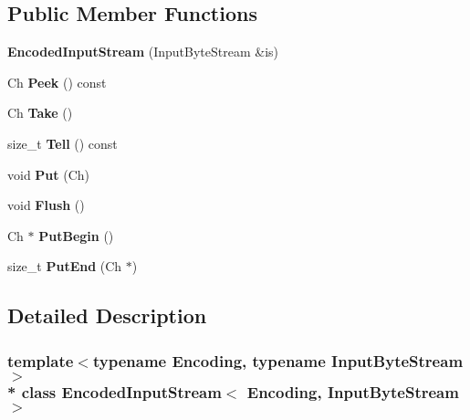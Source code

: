 \subsection*{Public Member Functions}
\begin{DoxyCompactItemize}
\item 
{\bfseries Encoded\+Input\+Stream} (Input\+Byte\+Stream \&is)\hypertarget{a00092_a17f8e629500f6ae71cb72d1d63bf41fd}{}\label{a00092_a17f8e629500f6ae71cb72d1d63bf41fd}

\item 
Ch {\bfseries Peek} () const \hypertarget{a00092_abda3b0c141254343f4c481f67d52b423}{}\label{a00092_abda3b0c141254343f4c481f67d52b423}

\item 
Ch {\bfseries Take} ()\hypertarget{a00092_ab42cd57581bf62e42af471583e5b8377}{}\label{a00092_ab42cd57581bf62e42af471583e5b8377}

\item 
size\+\_\+t {\bfseries Tell} () const \hypertarget{a00092_a34cdb99fd81cd211f71903348e9c986f}{}\label{a00092_a34cdb99fd81cd211f71903348e9c986f}

\item 
void {\bfseries Put} (Ch)\hypertarget{a00092_afea36b666a44bd4adeabfcab7b68a322}{}\label{a00092_afea36b666a44bd4adeabfcab7b68a322}

\item 
void {\bfseries Flush} ()\hypertarget{a00092_aa4415bf4b97dd01e8c3de0ad7a161724}{}\label{a00092_aa4415bf4b97dd01e8c3de0ad7a161724}

\item 
Ch $\ast$ {\bfseries Put\+Begin} ()\hypertarget{a00092_ad97f7a549a8622c61b7fb2c63fedd69b}{}\label{a00092_ad97f7a549a8622c61b7fb2c63fedd69b}

\item 
size\+\_\+t {\bfseries Put\+End} (Ch $\ast$)\hypertarget{a00092_a83fe5ed281413d6005d1b324730e8bed}{}\label{a00092_a83fe5ed281413d6005d1b324730e8bed}

\end{DoxyCompactItemize}


\subsection{Detailed Description}
\subsubsection*{template$<$typename Encoding, typename Input\+Byte\+Stream$>$\\*
class Encoded\+Input\+Stream$<$ Encoding, Input\+Byte\+Stream $>$}

